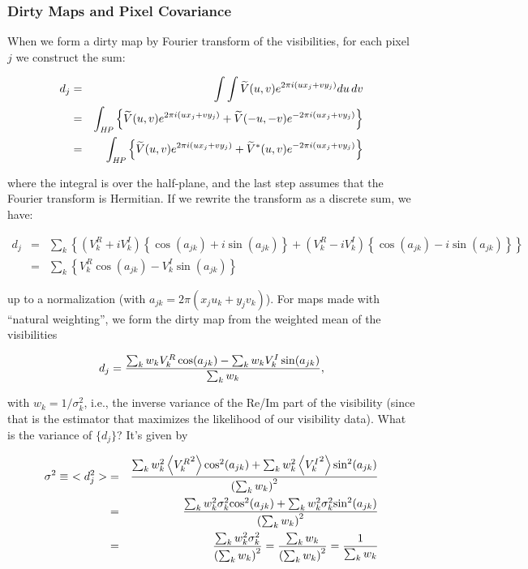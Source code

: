 \subsubsection{Dirty Maps and Pixel Covariance}

When we form a dirty map by Fourier transform of the visibilities, for
each pixel $j$ we construct the sum:

\begin{eqnarray}\nonumber
d_j &=& \int\int\widetilde{V}(u,v)e^{2\pi i(ux_j + vy_j)}du\,dv\\\nonumber
    &=& \int_{\it HP}\left\{\widetilde{V}(u,v)e^{2\pi i(ux_j + vy_j)} + \widetilde{V}(-u,-v)e^{-2\pi i(ux_j + vy_j)}\right\}\\
    &=& \int_{\it HP}\left\{\widetilde{V}(u,v)e^{2\pi i(ux_j + vy_j)} + \widetilde{V}^*(u,v)e^{-2\pi i(ux_j + vy_j)}\right\}
\label{eq:dirtyint}
\end{eqnarray}

where the integral is over the half-plane, and the last step assumes
that the Fourier transform is Hermitian.  If we rewrite the transform
as a discrete sum, we have:

\begin{eqnarray}\nonumber
  d_j &=& \sum_k{\left\{\left(V^R_k + iV^I_k\right)\left\{\cos(a_{jk}) + i\sin(a_{jk})\right\} + \left(V^R_k - iV^I_k\right)\left\{\cos(a_{jk}) - i\sin(a_{jk})\right\}\right\}}\\
    &=& \sum_k{\left\{V^R_k\cos(a_{jk}) - V^I_k\sin(a_{jk})\right\}}
\end{eqnarray}

up to a normalization (with $a_{jk} = 2\pi(x_ju_k + y_jv_k)$).  For maps made with ``natural
weighting'', we form the dirty map from the weighted mean of the
visibilities

\begin{equation}
d_j = {{\sum_k{w_kV^R_k}\cos(a_{jk}) - \sum_k{w_kV^I_k}\sin(a_{jk})}\over{\sum_k{w_k}}},
\label{eq:dirtysig}
\end{equation}

with $w_k = 1/\sigma^2_k$, i.e., the inverse variance of the Re/Im
part of the visibility (since that is the estimator that maximizes the
likelihood of our visibility data).  What is the variance of
$\{d_j\}$?  It's given by

\begin{eqnarray}\nonumber
\sigma^2 \equiv\ <d_j^2> &=& {{\sum_k{w^2_k\left<{V^R_k}^2\right>\cos^2(a_{jk})} + \sum_k{w^2_k\left<{V^I_k}^2\right>\sin^2(a_{jk})}\over{\left(\sum_k{w_k}\right)^2}}}\\\nonumber
&=& {{{\sum_k{w^2_k\sigma^2_k{\cos^2(a_{jk})}}} + \sum_k{w^2_k\sigma^2_k{\sin^2(a_{jk})}}}\over{\left(\sum_k{w_k}\right)^2}}\\
&=& {{\sum_k{w^2_k\sigma^2_k}}\over{\left(\sum_k{w_k}\right)^2}} = {{\sum_k{w_k}}\over{\left(\sum_k{w_k}\right)^2}} = {{1}\over{\sum_k{w_k}}}
\label{eq:dirtyvar}
\end{eqnarray}

